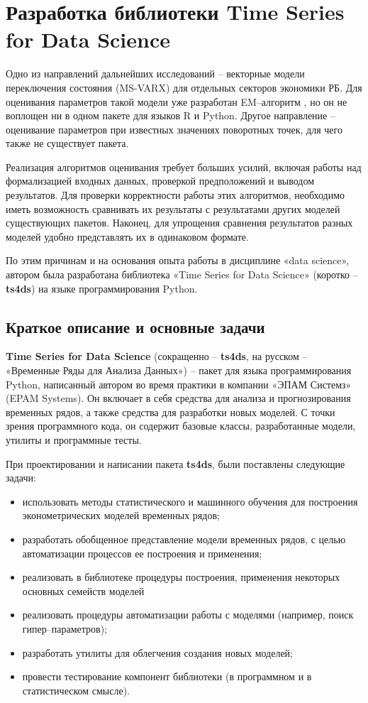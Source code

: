 \documentclass[../report.tex]{subfiles}
\begin{document}
	
	\chapter{Разработка библиотеки Time Series for Data Science}
	
	Одно из направлений дальнейших исследований – векторные модели переключения состояния (MS-VARX) для отдельных секторов экономики РБ. Для оценивания параметров такой модели уже разработан EM–алгоритм \cite{malNovopMSVARX}, но он не воплощен ни в одном пакете для языков R и Python. Другое направление – оценивание параметров при известных значениях поворотных точек, для чего также не существует пакета.
	
	Реализация алгоритмов оценивания требует больших усилий, включая работы над формализацией входных данных, проверкой предположений и выводом результатов. Для проверки корректности работы этих алгоритмов, необходимо иметь возможность сравнивать их результаты с результатами других моделей существующих пакетов. Наконец, для упрощения сравнения результатов разных моделей удобно представлять их в одинаковом формате.
	
	По этим причинам и на основания опыта работы в дисциплине «data science», автором была разработана библиотека «Time Series for Data Science» (коротко – \textbf{ts4ds}) на языке программирования Python. 
	
	\section{Краткое описание и основные задачи}
	
	\textbf{Time Series for Data Science} (сокращенно – \textbf{ts4ds}, на русском – «Временные Ряды для Анализа Данных») – пакет для языка программирования Python, написанный автором во время практики в компании «ЭПАМ Системз» (EPAM Systems). Он включает в себя средства для анализа и прогнозирования временных рядов, а также средства для разработки новых моделей. С точки зрения программного кода, он содержит базовые классы, разработанные модели, утилиты и программные тесты.
	
	При проектировании и написании пакета \textbf{ts4ds}, были поставлены следующие задачи:
	\begin{itemize}
		\item использовать методы статистического и машинного обучения для построения эконометрических моделей временных рядов;
		\item разработать обобщенное представление модели временных рядов, с целью автоматизации процессов ее построения и применения;
		\item реализовать в библиотеке процедуры построения, применения некоторых основных семейств моделей
		\item реализовать процедуры автоматизации работы с моделями (например, поиск гипер–параметров);
		\item разработать утилиты для облегчения создания новых моделей;
		\item провести тестирование компонент библиотеки (в программном и в статистическом смысле).
	\end{itemize}
	
\end{document}
